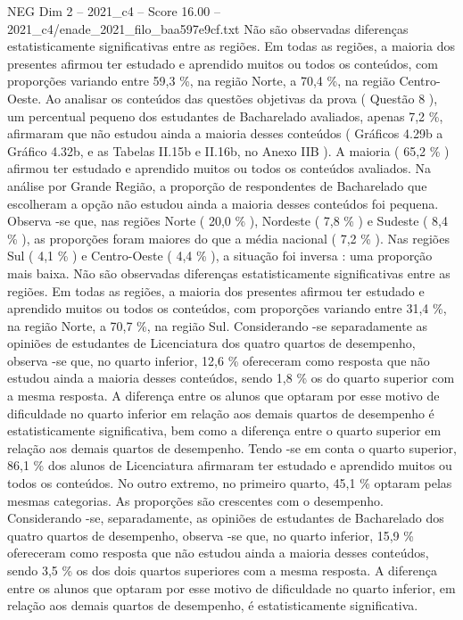 \begin{textsample}{NEG Dim 2 – 2021\_c4 – Score 16.00 – 2021\_c4/enade\_2021\_filo\_baa597e9cf.txt}
Não são observadas diferenças estatisticamente significativas entre as regiões.
Em todas as regiões, a maioria dos presentes afirmou ter estudado e aprendido muitos ou todos os conteúdos, com proporções variando entre 59,3 \%, na região Norte, a 70,4 \%, na região Centro-Oeste.
Ao analisar os conteúdos das questões objetivas da prova ( Questão 8 ), um percentual pequeno dos estudantes de Bacharelado avaliados, apenas 7,2 \%, afirmaram que não estudou ainda a maioria desses conteúdos ( Gráficos 4.29b a Gráfico 4.32b, e as Tabelas II.15b e II.16b, no Anexo IIB ).
A maioria ( 65,2 \% ) afirmou ter estudado e aprendido muitos ou todos os conteúdos avaliados.
Na análise por Grande Região, a proporção de respondentes de Bacharelado que escolheram a opção não estudou ainda a maioria desses conteúdos foi pequena.
Observa -se que, nas regiões Norte ( 20,0 \% ), Nordeste ( 7,8 \% ) e Sudeste ( 8,4 \% ), as proporções foram maiores do que a média nacional ( 7,2 \% ).
Nas regiões Sul ( 4,1 \% ) e Centro-Oeste ( 4,4 \% ), a situação foi inversa : uma proporção mais baixa.
Não são observadas diferenças estatisticamente significativas entre as regiões.
Em todas as regiões, a maioria dos presentes afirmou ter estudado e aprendido muitos ou todos os conteúdos, com proporções variando entre 31,4 \%, na região Norte, a 70,7 \%, na região Sul.
Considerando -se separadamente as opiniões de estudantes de Licenciatura dos quatro quartos de desempenho, observa -se que, no quarto inferior, 12,6 \% ofereceram como resposta que não estudou ainda a maioria desses conteúdos, sendo 1,8 \% os do quarto superior com a mesma resposta.
A diferença entre os alunos que optaram por esse motivo de dificuldade no quarto inferior em relação aos demais quartos de desempenho é estatisticamente significativa, bem como a diferença entre o quarto superior em relação aos demais quartos de desempenho.
Tendo -se em conta o quarto superior, 86,1 \% dos alunos de Licenciatura afirmaram ter estudado e aprendido muitos ou todos os conteúdos.
No outro extremo, no primeiro quarto, 45,1 \% optaram pelas mesmas categorias.
As proporções são crescentes com o desempenho.
Considerando -se, separadamente, as opiniões de estudantes de Bacharelado dos quatro quartos de desempenho, observa -se que, no quarto inferior, 15,9 \% ofereceram como resposta que não estudou ainda a maioria desses conteúdos, sendo 3,5 \% os dos dois quartos superiores com a mesma resposta.
A diferença entre os alunos que optaram por esse motivo de dificuldade no quarto inferior, em relação aos demais quartos de desempenho, é estatisticamente significativa.

\end{textsample}
